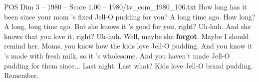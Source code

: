 \begin{textsample}{POS Dim 3 – 1980 – Score 1.00 – 1980/tv\_com\_1980\_106.txt}  \label{ex:f3_pos_060}
How long has it been since your mom 's fixed Jell-O pudding for you?
A long time ago.
How long?
A long, long time ago.
But she knows it 's good for you, right?
Uh-huh.
And she knows that you love it, right?
Uh-huh.
Well, maybe she \textbf{forgot}.
Maybe I should remind her.
Moms, you know how the kids love Jell-O pudding.
And you know it 's made with fresh milk, so it 's wholesome.
And you haven't made Jell-O pudding for them since...
Last night.
Last what?
Kids love Jell-O brand pudding.
Remember.

\end{textsample}
